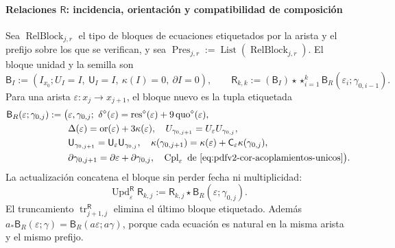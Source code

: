 \paragraph{Relaciones \(\mathsf R\): incidencia, orientación y compatibilidad de composición}
Sea \(\operatorname{RelBlock}_{j,r}\) el tipo de bloques de ecuaciones
etiquetados por la arista y el prefijo sobre los que se verifican, y sea
\(\operatorname{Pres}_{j,r}:=\operatorname{List}
(\operatorname{RelBlock}_{j,r})\). El bloque unidad y la semilla son
\begin{equation}
\label{eq:pdfv2-terminal-semilla-r}
 \mathsf B_I:=(I_{x_0};U_I=I,\ \mathsf U_I=I,\ \kappa(I)=0,\ \partial I=0),
 \qquad
 \mathsf R_{k,k}:=(\mathsf B_I)\star
 \mathop{\star}_{i=1}^{k}
 \mathsf B_R(\varepsilon_i;\gamma_{0,i-1}).
\end{equation}
Para una arista \(\varepsilon:x_j\to x_{j+1}\), el bloque nuevo es la
tupla etiquetada
\begin{equation}
\label{eq:pdfv2-terminal-bloque-r}
 \begin{split}
 \mathsf B_R(\varepsilon;\gamma_{0,j}):=\bigl(
 &\varepsilon,\gamma_{0,j};\ 
 \delta^\diamond(\varepsilon)
 =\operatorname{res}^\diamond(\varepsilon)
  +9\operatorname{quo}^\diamond(\varepsilon),\\
 &\Delta(\varepsilon)=\operatorname{or}(\varepsilon)
  +3\kappa(\varepsilon),\quad
 U_{\gamma_{0,j+1}}=U_\varepsilon U_{\gamma_{0,j}},\\
 &\mathsf U_{\gamma_{0,j+1}}
 =\mathsf U_\varepsilon\mathsf U_{\gamma_{0,j}},\quad
 \kappa(\gamma_{0,j+1})
 =\kappa(\varepsilon)+\mathsf C_\varepsilon\kappa(\gamma_{0,j}),\\
 &\partial\gamma_{0,j+1}
 =\partial\varepsilon+\partial\gamma_{0,j},\quad
 \operatorname{Cpl}_\varepsilon
 \text{ de }\eqref{eq:pdfv2-cor-acoplamientos-unicos}
 \bigr).
 \end{split}
\end{equation}
La actualización concatena el bloque sin perder fecha ni multiplicidad:
\begin{equation}
\label{eq:pdfv2-terminal-update-r}
 \operatorname{Upd}^{\mathsf R}_{\varepsilon}\mathsf R_{k,j}
 :=\mathsf R_{k,j}\star\mathsf B_R(\varepsilon;\gamma_{0,j}).
\end{equation}
El truncamiento \(\operatorname{tr}^{\mathsf R}_{j+1,j}\) elimina el último
bloque etiquetado. Además
\(a_*\mathsf B_R(\varepsilon;\gamma)
=\mathsf B_R(a\varepsilon;a\gamma)\), porque cada ecuación es natural en
la misma arista y el mismo prefijo.

